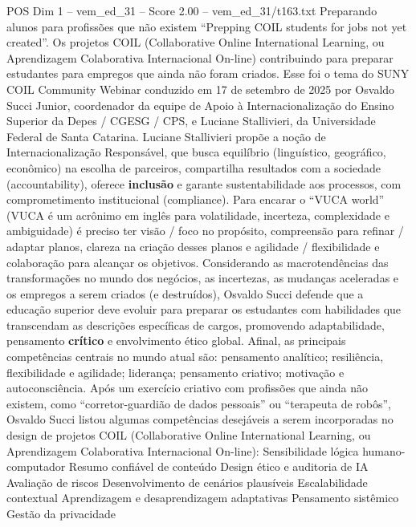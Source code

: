 \begin{textsample}{POS Dim 1 – vem\_ed\_31 – Score 2.00 – vem\_ed\_31/t163.txt}  \label{ex:f1_pos_009}
Preparando alunos para profissões que não existem “Prepping COIL students for jobs not yet created”.
Os projetos COIL (Collaborative Online International Learning, ou Aprendizagem Colaborativa Internacional On-line) contribuindo para preparar estudantes para empregos que ainda não foram criados.
Esse foi o tema do SUNY COIL Community Webinar conduzido em 17 de setembro de 2025 por Osvaldo Succi Junior, coordenador da equipe de Apoio à Internacionalização do Ensino Superior da Depes / CGESG / CPS, e Luciane Stallivieri, da Universidade Federal de Santa Catarina.
Luciane Stallivieri propõe a noção de Internacionalização Responsável, que busca equilíbrio (linguístico, geográfico, econômico) na escolha de parceiros, compartilha resultados com a sociedade (accountability), oferece \textbf{inclusão} e garante sustentabilidade aos processos, com comprometimento institucional (compliance).
Para encarar o “VUCA world” (VUCA é um acrônimo em inglês para volatilidade, incerteza, complexidade e ambiguidade) é preciso ter visão / foco no propósito, compreensão para refinar / adaptar planos, clareza na criação desses planos e agilidade / flexibilidade e colaboração para alcançar os objetivos.
Considerando as macrotendências das transformações no mundo dos negócios, as incertezas, as mudanças aceleradas e os empregos a serem criados (e destruídos), Osvaldo Succi defende que a educação superior deve evoluir para preparar os estudantes com habilidades que transcendam as descrições específicas de cargos, promovendo adaptabilidade, pensamento \textbf{crítico} e envolvimento ético global.
Afinal, as principais competências centrais no mundo atual são: pensamento analítico; resiliência, flexibilidade e agilidade; liderança; pensamento criativo; motivação e autoconsciência.
Após um exercício criativo com profissões que ainda não existem, como “corretor-guardião de dados pessoais” ou “terapeuta de robôs”, Osvaldo Succi listou algumas competências desejáveis a serem incorporadas no design de projetos COIL (Collaborative Online International Learning, ou Aprendizagem Colaborativa Internacional On-line): Sensibilidade lógica humano-computador Resumo confiável de conteúdo Design ético e auditoria de IA Avaliação de riscos Desenvolvimento de cenários plausíveis Escalabilidade contextual Aprendizagem e desaprendizagem adaptativas Pensamento sistêmico Gestão da privacidade

\end{textsample}
